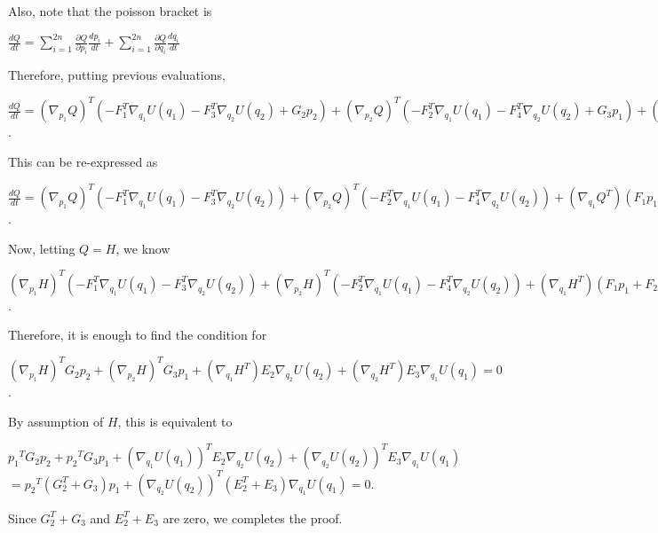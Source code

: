 \documentclass{article}
\begin{document}
\\
\\
Also, note that the poisson bracket is 
\begin{center}
$\displaystyle\frac{dQ}{dt} = \sum_{i=1}^{2n} \frac{\partial Q} {\partial p_i} \frac{dp_i}{dt}+  \sum_{i=1}^{2n} \frac{\partial Q} {\partial q_i} \frac{dq_i}{dt}$ 
\end{center}
\noindent Therefore, putting previous evaluations, 
\begin{center}
$\displaystyle\frac{dQ}{dt} = (\nabla_{p_1}Q)^T (-F_1^T \nabla_{q_1} U(q_1) - F_3^T \nabla_{q_2} U(q_2)  + G_2 p_2) 
+  (\nabla_{p_2}Q)^T(-F_2^T \nabla_{q_1} U(q_1) - F_4^T \nabla_{q_2} U(q_2)  + G_3 p_1) 
+ (\nabla_{q_1}Q^T)(E_2 \nabla_{q_2} U(q_2) + F_1 p_1 + F_2 p_2) + (\nabla_{q_2}Q^T)(E_3 \nabla_{q_1} U(q_1) + F_3 p_1 + F_4 p_4)$.
\end{center}
This can be re-expressed as
\begin{center}
$\displaystyle\frac{dQ}{dt} = {(\nabla_{p_1}Q)^T}(-F_1^T \nabla_{q_1} U(q_1) - F_3^T\nabla_{q_2} U(q_2) ) +  
(\nabla_{p_2}Q)^T(-F_2^T \nabla_{q_1} U(q_1) - F_4^T \nabla_{q_2} U(q_2)) +  
(\nabla_{q_1}Q^T)( F_1 p_1 + F_2 p_2) +
(\nabla_{q_2}Q^T)(F_3 p_1 + F_4 p_4) +
(\nabla_{p_1}Q)^TG_2 p_2+ 
(\nabla_{p_2}Q)^TG_3 p_1+
(\nabla_{q_1}Q^T)E_2 \nabla_{q_2} U(q_2) +
(\nabla_{q_2}Q^T)E_3 \nabla_{q_1} U(q_1)$.
\end{center}
Now, letting $Q=H$, we know 
\begin{center}
${(\nabla_{p_1}H)^T}(-F_1^T \nabla_{q_1} U(q_1) - F_3^T\nabla_{q_2} U(q_2) ) +  
(\nabla_{p_2}H)^T(-F_2^T \nabla_{q_1} U(q_1) - F_4^T \nabla_{q_2} U(q_2)) +  
(\nabla_{q_1}H^T)( F_1 p_1 + F_2 p_2) +
(\nabla_{q_2}H^T)(F_3 p_1 + F_4 p_4)=0$.
\end{center}
Therefore, it is enough to find the condition for 
\begin{center}
$(\nabla_{p_1}H)^TG_2 p_2+ 
(\nabla_{p_2}H)^TG_3 p_1+
(\nabla_{q_1}H^T)E_2 \nabla_{q_2} U(q_2) +
(\nabla_{q_2}H^T)E_3 \nabla_{q_1} U(q_1) = 0$.
\end{center}
By assumption of $H$, this is equivalent to 
\begin{center}
${p_1}^TG_2 p_2+ 
{p_2}^TG_3 p_1+
(\nabla_{q_1}U(q_1))^TE_2 \nabla_{q_2} U(q_2) +
(\nabla_{q_2}U(q_2))^TE_3 \nabla_{q_1} U(q_1) $
\\
$={p_2}^T(G_2^T + G_3) p_1 + (\nabla_{q_2}U(q_2))^T(E_2^T + E_3) \nabla_{q_1} U(q_1) = 0$.
\end{center}
Since $G_2^T + G_3$ and $E_2^T + E_3 $ are zero, we completes the proof. 
\end{document}
